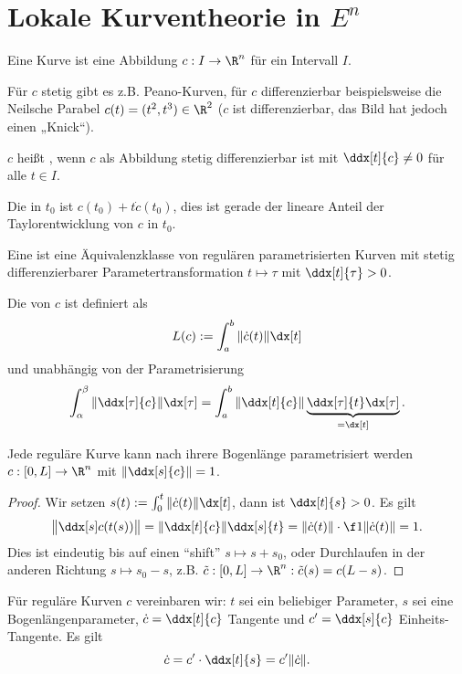 \chapter{Lokale Kurventheorie in $E^n$}


Eine Kurve ist eine Abbildung $c: I \to \R^n$ für ein Intervall $I$.

Für $c$ stetig gibt es z.B. Peano-Kurven, für $c$ differenzierbar beispielsweise die Neilsche Parabel $c(t) = (t^2, t^3) \in \R^2$ ($c$ ist differenzierbar, das Bild hat jedoch einen „Knick“).

\begin{df}
	$c$ heißt , wenn $c$ als Abbildung stetig differenzierbar ist mit $\ddx[t]{c} \neq 0$ für alle $t \in I$.

	Die  in $t_0$ ist $c(t_0) + t \dot c(t_0)$, dies ist gerade der lineare Anteil der Taylorentwicklung von $c$ in $t_0$.

	Eine  ist eine Äquivalenzklasse von regulären parametrisierten Kurven mit stetig differenzierbarer Parametertransformation $t \mapsto \tau$ mit $\ddx[t]{\tau} > 0$.

	Die  von $c$ ist definiert als
	\[
		L(c) := \int_a^b \|\dot c(t)\| \dx[t]
	\]
	und unabhängig von der Parametrisierung
	\[
		\int_{\alpha}^{\beta} \| \ddx[\tau]{c} \| \dx[\tau]
		= \int_a^b \|\ddx[t]{c} \| \underbrace{\ddx[\tau]{t} \dx[\tau]}_{= \dx[t]}.
	\]
\end{df}

\begin{lem}
	Jede reguläre Kurve kann nach ihrere Bogenlänge parametrisiert werden $c: [0,L] \to \R^n$ mit $\|\ddx[s]{c}\| = 1$.
	\begin{proof}
		Wir setzen $s(t) := \int_0^t \|\dot c(t)\| \dx[t]$, dann ist $\ddx[t]{s} > 0$.
		Es gilt
		\[
			\big\| \ddx[s] c(t(s)) \big\|
			= \| \ddx[t]{c} \| \ddx[s]{t}
			= \|\dot c(t)\| \cdot \f 1{\|\dot c(t)\|}
			= 1.
		\]
		Dies ist eindeutig bis auf einen “shift” $s \mapsto s + s_0$,
		oder Durchlaufen in der anderen Richtung $s \mapsto s_0 - s$, z.B. $\tilde c: [0,L] \to \R^n : \tilde c(s) = c(L - s)$.
	\end{proof}
\end{lem}

\begin{conv}
	Für reguläre Kurven $c$ vereinbaren wir:
	$t$ sei ein beliebiger Parameter, $s$ sei eine Bogenlängenparameter, $\dot c = \ddx[t]{c}$ Tangente und $c' = \ddx[s]{c}$ Einheits-Tangente.
	Es gilt
	\[
		\dot c = c' \cdot \ddx[t]{s} = c' \|\dot c\|.
	\]
\end{conv}

